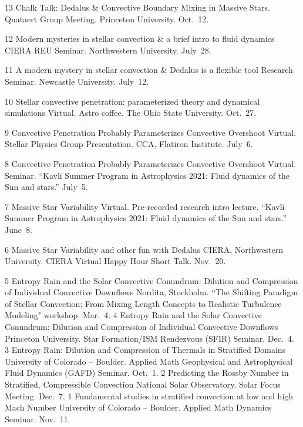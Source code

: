 \cvpub{}
      {13}
      {
        Chalk Talk: Dedalus \& Convective Boundary Mixing in Massive Stars.  
      }
      {
        Quataert Group Meeting. Princeton University. Oct.~12.
      }



\cvpub{}
      {12}
      {  
        Modern mysteries in stellar convection \& a brief intro to fluid dynamics
      }
      {
        CIERA REU Seminar. Northwestern University. July~28.
      }



\cvpub{}
      {11}
      { A modern mystery in stellar convection \& Dedalus is a flexible tool }
      {
        Research Seminar. Newcastle University. July~12.
      }

	  {10}
	  {Stellar convective penetration: parameterized theory and dynamical simulations}
	  {
	  	Virtual. Astro coffee. The Ohio State University. Oct.~27.
	  }

\cvpub{}
	  {9}
	  {Convective Penetration Probably Parameterizes Convective Overshoot}
	  {
	  	Virtual. Stellar Physics Group Presentation. CCA, Flatiron Institute. July~6.
	  }

\cvpub{}
	  {8}
	  {Convective Penetration Probably Parameterizes Convective Overshoot}
	  {
	  	Virtual. Seminar. ``Kavli Summer Program in Astrophysics 2021: Fluid dynamics of the Sun and stars.'' July~5.
	  }


\cvpub{}
	  {7}
	  {Massive Star Variability}
	  {
	  	Virtual. Pre-recorded research intro lecture. ``Kavli Summer Program in Astrophysics 2021: Fluid dynamics of the Sun and stars.'' June~8.
	  }

	  {6}
	  {Massive Star Variability and other fun with Dedalus}
	  {
	  	CIERA, Northwestern University. CIERA Virtual Happy Hour Short Talk. Nov.~20.
	  }

\cvpub{}
	  {5}
	  {Entropy Rain and the Solar Convective Conundrum: Dilution and Compression of Individual Convective Downflows}
	  {
	  	Nordita, Stockholm. ``The Shifting Paradigm of Stellar Convection: From Mixing Length Concepts to Realistic Turbulence Modeling" workshop. Mar.~4.
	  }
	  {4}
	  {Entropy Rain and the Solar Convective Conundrum: Dilution and Compression of Individual Convective Downflows}
	  {
	  	Princeton University. Star Formation/ISM Rendezvous (SFIR) Seminar. Dec.~4.
	  }
\cvpub{}
	  {3}
	  {Entropy Rain: Dilution and Compression of Thermals in Stratified Domains}
	  {
	  	University of Colorado -- Boulder. Applied Math Geophysical and Astrophysical Fluid Dynamics (GAFD) Seminar. Oct.~1.
	  }
	  {2}
	  {Predicting the Rossby Number in Stratified, Compressible Convection}
	  {
	  	National Solar Observatory. Solar Focus Meeting. Dec.~7.
	  }
      {1}
      {Fundamental studies in stratified convection at low and high Mach Number}
      {
        University of Colorado -- Boulder. Applied Math Dynamics Seminar. Nov.~11.
      }
